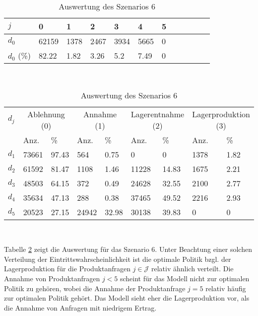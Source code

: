 \begin{table}[h!]
\renewcommand{\arraystretch}{1.5}
  \begin{center}
    \caption{Auswertung des Szenarios 6}  \label{AS6}
    \vspace*{3mm}
    \begin{tabular}{l l l l l l l l l l l l }  \hline 
         $j$ & 0 & 1  & 2 & 3 & 4  & 5   \\  \hline
$d_{0}$ &  62159 &  1378 &  2467 &  3934 &  5665 &  0 \\
$d_{0}$ (\%) &  82.22 &  1.82 &  3.26 &   5.2 &  7.49 &  0 \\
\hline
    \end{tabular} \\[3mm]
        \begin{tabular}{ l l l l l l l l l}   \hline    %
    $d_j$ & \multicolumn{2}{c}{Ablehnung (0)} & \multicolumn{2}{c}{Annahme (1)}  & \multicolumn{2}{c}{Lagerentnahme (2)} & \multicolumn{2}{c}{Lagerproduktion (3)}\\
    & Anz. & \% & Anz. & \% & Anz. & \% & Anz. & \% \\ \hline 
$d_{1}$ &  73661 &  97.43 &    564 &   0.75 &    0 &    0 &  1378 &  1.82 \\
$d_{2}$ &  61592 &  81.47 &   1108 &   1.46 &  11228 &  14.83 &  1675 &  2.21 \\
$d_{3}$ &  48503 &  64.15 &    372 &   0.49 &  24628 &  32.55 &  2100 &  2.77 \\
$d_{4}$ &  35634 &  47.13 &    288 &   0.38 &  37465 &  49.52 &  2216 &  2.93 \\
$d_{5}$ &  20523 &  27.15 &  24942 &  32.98 &  30138 &  39.83 &   0 &   0 \\
          \hline
   \end{tabular} \\[3mm]
     \end{center}
\end{table}

Tabelle \ref{AS6} zeigt die Auswertung für das Szenario 6. Unter Beachtung einer solchen Verteilung der Eintrittswahrscheinlichkeit ist die optimale Politik bzgl. der Lagerproduktion für die Produktanfragen $j\in\mathcal{J}$ relativ ähnlich verteilt. Die Annahme von Produktanfragen $j<5$ scheint für das Modell nicht zur optimalen Politik zu gehören, wobei die Annahme der Produktanfrage $j=5$ relativ häufig zur optimalen Politik gehört. Das Modell sieht eher die Lagerproduktion vor, als die Annahme von Anfragen mit niedrigem Ertrag. %


